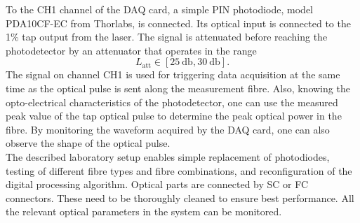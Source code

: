 \documentclass{standalone}
\begin{document}
To the CH1 channel of the DAQ card, a simple PIN photodiode, model PDA10CF-EC from Thorlabs, is connected. Its optical input is connected to the 1\% tap output from the laser. The signal is attenuated before reaching the photodetector by an attenuator that operates in the range
\begin{equation}
L_\textrm{att} \in [\SI{25}{\decibel}, \SI{30}{\decibel}] \textrm{.}
\end{equation}
The signal on channel CH1 is used for triggering data acquisition at the same time as the optical pulse is sent along the measurement fibre. Also, knowing the opto-electrical characteristics of the photodetector, one can use the measured peak value of the tap optical pulse to determine the peak optical power in the fibre. By monitoring the waveform acquired by the DAQ card, one can also observe the shape of the optical pulse. \\

The described laboratory setup enables simple replacement of photodiodes, testing of different fibre types and fibre combinations, and reconfiguration of the digital processing algorithm. Optical parts are connected by SC or FC connectors. These need to be thoroughly cleaned to ensure best performance. All the relevant optical parameters in the system can be monitored. 


\setcounter{stranica}{\thepage}
\addtocounter{stranica}{1}
\end{document}
